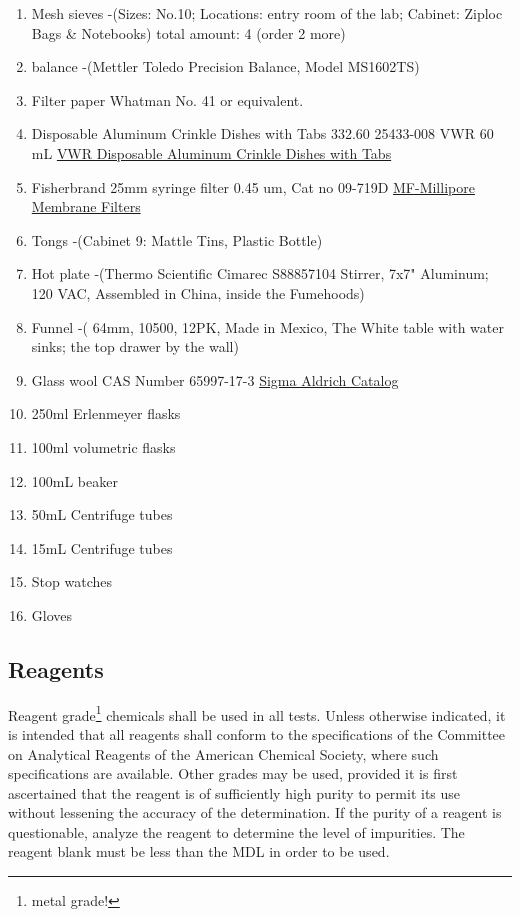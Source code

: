 \documentclass[12pt]{../SOP3_alpha}\usepackage[]{graphicx}\usepackage[]{color}
\begin{document}
\begin{enumerate}
  \item Mesh sieves -(Sizes: No.10; Locations: entry room of the lab; Cabinet: Ziploc Bags \& Notebooks) total amount: 4 (order 2 more) 
  \item balance -(Mettler Toledo Precision Balance, Model MS1602TS)
  \item Filter paper Whatman No. 41 or equivalent. 
  \item Disposable Aluminum Crinkle Dishes with Tabs 332.60 25433-008 VWR 60 mL          \href{https://us.vwr.com/store/catalog/product.jsp?product_id=4622693}{VWR Disposable Aluminum Crinkle Dishes with Tabs}
  \item Fisherbrand 25mm syringe filter 0.45 um, Cat no 09-719D \href{https://www.emdmillipore.com/US/en/product/MF-Millipore%E2%84%A2-Membrane-Filters,MM_NF-C152}{MF-Millipore Membrane Filters}
  \item Tongs -(Cabinet 9: Mattle Tins, Plastic Bottle)
  \item Hot plate -(Thermo Scientific Cimarec S88857104 Stirrer, 7x7" Aluminum; 120 VAC, Assembled in China, inside the Fumehoods)
  \item Funnel -( 64mm, 10500, 12PK, Made in Mexico, The White table with water sinks; the top drawer by the wall)
  \item Glass wool CAS Number 65997-17-3 \href{http://www.sigmaaldrich.com/catalog/product/sial/18421?lang=en&region=US}{Sigma Aldrich Catalog}
  \item 250ml Erlenmeyer flasks
  \item 100ml volumetric flasks
  \item 100mL beaker
  \item 50mL Centrifuge tubes
  \item 15mL Centrifuge tubes
  \item Stop watches 
  \item Gloves
\end{enumerate}

\subsection{Reagents}

\NP Reagent grade\footnote{metal grade!} chemicals shall be used in all tests. Unless otherwise indicated, it is
intended that all reagents shall conform to the specifications of the Committee on Analytical Reagents of the American Chemical Society, where such specifications are available. Other grades may be used, provided it is first ascertained that the reagent is of sufficiently high purity to permit its use without lessening the accuracy of the determination. If the purity of a reagent is questionable, analyze the reagent to determine the level of impurities. The reagent blank must be less than the MDL in order to be used. 
\end{document}
